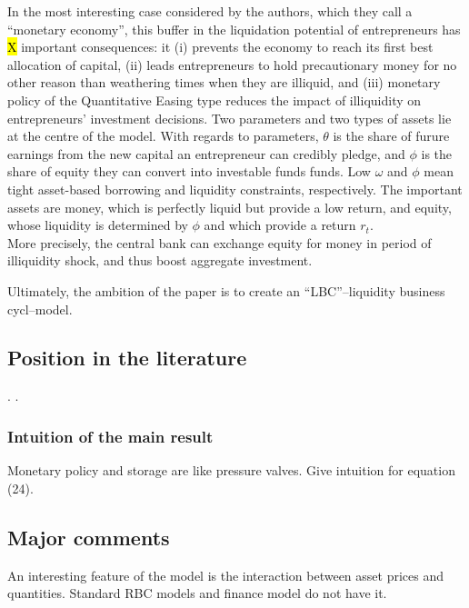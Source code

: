 \documentclass{amsart}
\theoremstyle{definition}
\theoremstyle{remark}
\numberwithin{equation}{section}
\begin{document}
In the most interesting case considered by the authors, which they call a ``monetary economy'', this buffer in the liquidation potential of entrepreneurs has \hl{X} important consequences: it (i) prevents the economy to reach its first best allocation of capital, (ii) leads entrepreneurs to hold precautionary money for no other reason than weathering times when they are illiquid, and (iii) monetary policy of the Quantitative Easing type reduces the impact of illiquidity on entrepreneurs' investment decisions. Two parameters and two types of assets lie at the centre of the model. With regards to parameters, $\theta$ is the share of furure earnings from the new capital an entrepreneur can credibly pledge, and $\phi$ is the share of equity they can convert into investable funds funds. Low $\omega$ and $\phi$ mean tight asset-based borrowing and liquidity constraints, respectively. The important assets are money, which is perfectly liquid but provide a low return, and equity, whose liquidity is determined by $\phi$ and which provide a return $r_t$. \\





More precisely, the central bank can exchange equity for money in period of illiquidity shock, and thus boost aggregate investment. 


Ultimately, the ambition of the paper is to create an ``LBC''--liquidity business cycl--model.


\subsection*{Position in the literature}. \cite{gertler2016wholesale}.

\subsubsection*{Intuition of the main result}

Monetary policy and storage are like pressure valves. Give intuition for equation (24).

\subsection*{Major comments} An interesting feature of the model is the interaction between asset prices and quantities. Standard RBC models and finance model do not have it.\\
\end{document}
